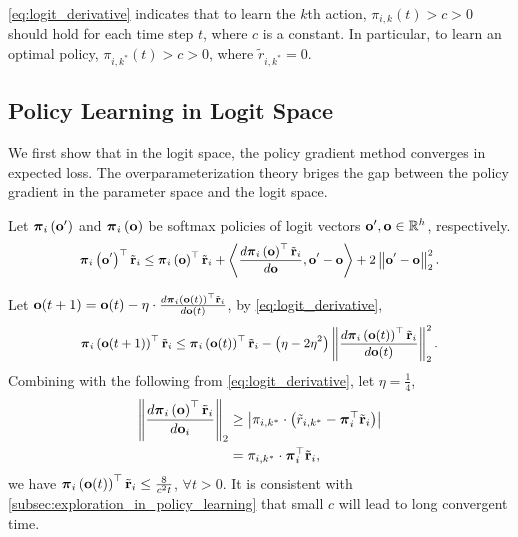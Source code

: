 \cref{eq:logit_derivative} indicates that to learn the $k$th action, $\pi_{i,k}(t) > c > 0$ should hold for each time step $t$, where $c$ is a constant. In particular, to learn an optimal policy, $\pi_{i,k^*}(t) > c > 0$, where $\tilde{r}_{i,k^*} = 0$.

\subsection{Policy Learning in Logit Space}

We first show that in the logit space, the policy gradient method converges in expected loss. The overparameterization theory briges the gap between the policy gradient in the parameter space and the logit space.

\begin{lem}
\label{lem:logit_smoothness}
Let ${\boldsymbol{\pi}}_i\left( {\mathbf{o}}^\prime \right)$ and ${\boldsymbol{\pi}}_i\left( {\mathbf{o}} \right)$ be softmax policies of logit vectors ${\mathbf{o}}^\prime, {\mathbf{o}} \in {\mathbb{R}}^h$, respectively.
\begin{equation*}
\small
    \rvpi_i\left( \rvo^\prime \right)^\top \rvtilder_i \le \rvpi_i\left( \rvo \right)^\top \rvtilder_i + \left\langle \frac{d \rvpi_i\left( \rvo \right)^\top \rvtilder_i}{d \rvo}, \rvo^\prime - \rvo \right\rangle + 2 \left\| \rvo^\prime - \rvo \right\|_2^2.
\end{equation*}
\end{lem}
Let ${\mathbf{o}}(t+1) = {\mathbf{o}}(t) - \eta \cdot \frac{d {\boldsymbol{\pi}}_i\left( {\mathbf{o}}(t) \right)^\top {\tilde{\mathbf{r}}}_i}{d {\mathbf{o}}(t)}$, by \cref{eq:logit_derivative},
\begin{equation*}
\begin{split}
\small
    \rvpi_i\left( \rvo(t+1) \right)^\top \rvtilder_i \le \rvpi_i\left( \rvo(t) \right)^\top \rvtilder_i - \left( \eta - 2 \eta^2 \right) \left\| \frac{d \rvpi_i\left( \rvo(t) \right)^\top \rvtilder_i}{d \rvo(t)} \right\|_2^2.
\end{split}
\end{equation*}
Combining with the following from \cref{eq:logit_derivative}, let $\eta = \frac{1}{4}$,
\begin{equation}
\label{eq:logit_derivative_lower_bound}
\begin{split}
    \left\| \frac{d {\boldsymbol{\pi}}_i\left( {\mathbf{o}} \right)^\top {\tilde{\mathbf{r}}}_i}{d {\mathbf{o}}_i} \right\|_2 &\ge \left| \pi_{i,k^*} \cdot \left( \tilde{r}_{i,k^*} - {\boldsymbol{\pi}}_i^\top {\tilde{\mathbf{r}}}_i \right) \right| \\
    &= \pi_{i,k^*} \cdot {\boldsymbol{\pi}}_i^\top {\tilde{\mathbf{r}}}_i,
\end{split}
\end{equation}
we have ${\boldsymbol{\pi}}_i\left( {\mathbf{o}}(t) \right)^\top {\tilde{\mathbf{r}}}_i \le \frac{8}{c^2 t}$, $\forall t > 0$. It is consistent with \cref{subsec:exploration_in_policy_learning} that small $c$ will lead to long convergent time.

